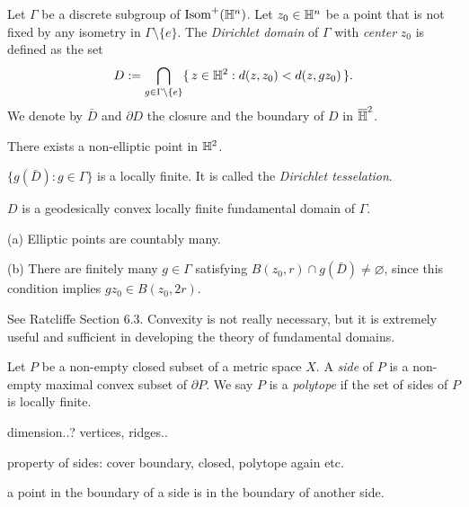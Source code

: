 \documentclass[a4paper]{article}
\begin{document}
\begin{prb}
Let $\Gamma$ be a discrete subgroup of $\operatorname{Isom}^+(\mathbb{H}^n)$.
Let $z_0\in\mathbb{H}^n$ be a point that is not fixed by any isometry in $\Gamma\setminus\{e\}$. %
The \emph{Dirichlet domain} of $\Gamma$ with \emph{center} $z_0$ is defined as the set
\[D:=\bigcap_{g\in\Gamma\setminus\{e\}}\{\,z\in\mathbb{H}^2:d(z,z_0)<d(z,gz_0)\,\}.\]
We denote by $\bar D$ and $\partial D$ the closure and the boundary of $D$ in $\overline{\mathbb{H}}^2$.
\begin{parts}
\item There exists a non-elliptic point in $\mathbb{H}^2$.
\item $\{g(\bar D):g\in\Gamma\}$ is a locally finite. It is called the \emph{Dirichlet tesselation}.
\item $D$ is a geodesically convex locally finite fundamental domain of $\Gamma$.
\end{parts}
\end{prb}
\begin{pf}
(a)
Elliptic points are countably many.

(b)
There are finitely many $g\in\Gamma$ satisfying $B(z_0,r)\cap g(\bar D)\ne\varnothing$, since this condition implies $gz_0\in B(z_0,2r)$.
\end{pf}



\begin{prb}
See Ratcliffe Section 6.3.
Convexity is not really necessary, but it is extremely useful and sufficient in developing the theory of fundamental domains.

Let $P$ be a non-empty closed subset of a metric space $X$.
A \emph{side} of $P$ is a non-empty maximal convex subset of $\partial P$.
We say $P$ is a \emph{polytope} if the set of sides of $P$ is locally finite.
\begin{parts}
\item dimension..? vertices, ridges..
\item property of sides: cover boundary, closed, polytope again etc.
\item a point in the boundary of a side is in the boundary of another side.
\end{parts}
\end{prb}
\end{document}
